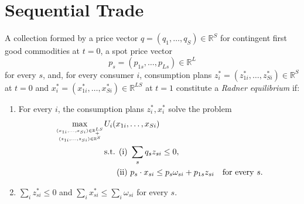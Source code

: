 \section{Sequential Trade}

\begin{defn}
    A collection formed by a price vector $q = (q_1, \dots, q_S) \in \mathbb{R}^{S}$ for contingent first good commodities at $t = 0$, a spot price vector
    \begin{equation*}
        p_s = (p_{1s}, \dots, p_{Ls}) \in \mathbb{R}^{L}
    \end{equation*}
    for every $s$, and, for every consumer $i$, consumption plans $z^*_i = (z^*_{1i}, \dots, z^*_{Si}) \in \mathbb{R}^{S}$ at $t = 0$ and $x^*_i = (x^*_{1i}, \dots, x^*_{Si}) \in \mathbb{R}^{LS}$ at $t = 1$ constitute a \emph{Radner equilibrium} if:
    \begin{enumerate}
        \item 
        For every $i$, the consumption plans $z^*_i, x^*_i$ solve the problem
        \begin{equation*}
            \begin{aligned}
                \max_{\genfrac{}{}{0pt}{}{(x_{1i}, \dots, x_{Si}) \in \mathbb{R}^{LS}_+}{(z_{1i}, \dots, z_{Si}) \in \mathbb{R}^{S}}} & U_i(x_{1i}, \dots, x_{Si})\\
                &\begin{aligned}
                    \text{s.t. (i) } & \sum_s q_s z_{si} \leq 0, \\
                    \text{(ii) } & p_s \cdot x_{si} \leq p_s \omega_{si} + p_{1s} z_{si} \quad \text{for every } s.
                \end{aligned}
            \end{aligned}
        \end{equation*}

        \item 
        $\sum_i z^*_{si} \leq 0$ and $\sum_i x^*_{si} \leq \sum_i \omega_{si}$ for every $s$.
    \end{enumerate}
\end{defn}

